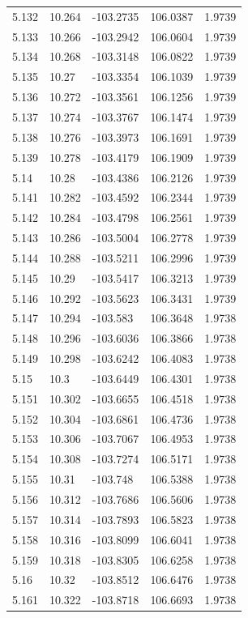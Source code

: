 \begin{tabular}{lllll}
5.132 & 10.264 & -103.2735 & 106.0387 & 1.9739 \\
5.133 & 10.266 & -103.2942 & 106.0604 & 1.9739 \\
5.134 & 10.268 & -103.3148 & 106.0822 & 1.9739 \\
5.135 & 10.27 & -103.3354 & 106.1039 & 1.9739 \\
5.136 & 10.272 & -103.3561 & 106.1256 & 1.9739 \\
5.137 & 10.274 & -103.3767 & 106.1474 & 1.9739 \\
5.138 & 10.276 & -103.3973 & 106.1691 & 1.9739 \\
5.139 & 10.278 & -103.4179 & 106.1909 & 1.9739 \\
5.14 & 10.28 & -103.4386 & 106.2126 & 1.9739 \\
5.141 & 10.282 & -103.4592 & 106.2344 & 1.9739 \\
5.142 & 10.284 & -103.4798 & 106.2561 & 1.9739 \\
5.143 & 10.286 & -103.5004 & 106.2778 & 1.9739 \\
5.144 & 10.288 & -103.5211 & 106.2996 & 1.9739 \\
5.145 & 10.29 & -103.5417 & 106.3213 & 1.9739 \\
5.146 & 10.292 & -103.5623 & 106.3431 & 1.9739 \\
5.147 & 10.294 & -103.583 & 106.3648 & 1.9738 \\
5.148 & 10.296 & -103.6036 & 106.3866 & 1.9738 \\
5.149 & 10.298 & -103.6242 & 106.4083 & 1.9738 \\
5.15 & 10.3 & -103.6449 & 106.4301 & 1.9738 \\
5.151 & 10.302 & -103.6655 & 106.4518 & 1.9738 \\
5.152 & 10.304 & -103.6861 & 106.4736 & 1.9738 \\
5.153 & 10.306 & -103.7067 & 106.4953 & 1.9738 \\
5.154 & 10.308 & -103.7274 & 106.5171 & 1.9738 \\
5.155 & 10.31 & -103.748 & 106.5388 & 1.9738 \\
5.156 & 10.312 & -103.7686 & 106.5606 & 1.9738 \\
5.157 & 10.314 & -103.7893 & 106.5823 & 1.9738 \\
5.158 & 10.316 & -103.8099 & 106.6041 & 1.9738 \\
5.159 & 10.318 & -103.8305 & 106.6258 & 1.9738 \\
5.16 & 10.32 & -103.8512 & 106.6476 & 1.9738 \\
5.161 & 10.322 & -103.8718 & 106.6693 & 1.9738 \\

\end{tabular}
